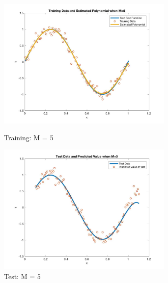 \documentclass[a4paper]{article}
\begin{document}
\begin{spacing}{2.0}
		\begin{figure}[H]
	    \begin{minipage}[t]{0.5\textwidth}
	        \centering
	        \includegraphics[width=3.4in]{5train.jpeg}
	        \caption{Training: M = 5}
	        \label{fig:side:a}
	    \end{minipage}
	  \begin{minipage}[t]{0.5\textwidth}
	      \centering
	      \includegraphics[width=3.4in]{5test.jpeg}
	      \caption{Test: M = 5}
	      \label{fig:side:b}
	    \end{minipage}
	\end{figure}	
	

\end{spacing}
\end{document}
